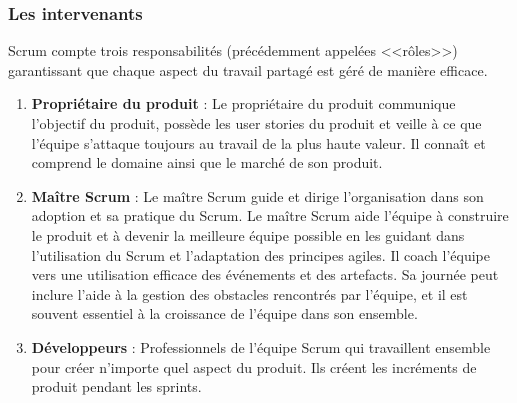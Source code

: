 \subsubsection{Les intervenants}
Scrum compte trois responsabilités (précédemment appelées <<rôles>>) garantissant que chaque aspect du travail partagé est géré de manière efficace.
\begin{enumerate}
   \item \textbf{Propriétaire du produit} : Le propriétaire du produit communique l'objectif du produit, possède les user stories du produit et veille à ce que l'équipe s'attaque toujours au travail de la plus haute valeur. Il connaît et comprend le domaine ainsi que le marché de son produit.
    \item \textbf{Maître Scrum} : Le maître Scrum guide et dirige l'organisation dans son adoption et sa pratique du Scrum. Le maître Scrum aide l'équipe à construire le produit et à devenir la meilleure équipe possible en les guidant dans l'utilisation du Scrum et l'adaptation des principes agiles. Il coach l'équipe vers une utilisation efficace des événements et des artefacts. Sa journée peut inclure l'aide à la gestion des obstacles rencontrés par l'équipe, et il est souvent essentiel à la croissance de l'équipe dans son ensemble. 
 \item \textbf{Développeurs} : Professionnels de l'équipe Scrum qui travaillent ensemble pour créer n'importe quel aspect du produit. Ils créent les incréments de produit pendant les sprints. 
    \end{enumerate}
